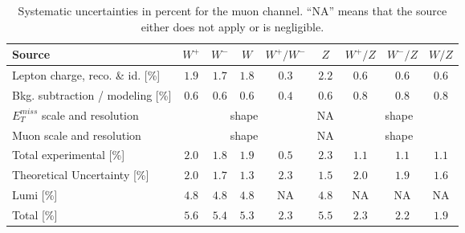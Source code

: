\begin{table}[htbp]
\centering
\small
\begin {tabular}  {lcccccccc}
Source & $W^+$ & $W^-$ & $W$ & $W^+/W^-$ & $Z$ & $W^+/Z$ & $W^-/Z$ & $W/Z$ \\
\hline
Lepton charge, reco. \& id. [\%] & $1.9$ & $1.7$ & $1.8$ & $0.3$ & $2.2$ & $0.6$ & $0.6$ & $0.6$ \\
Bkg. subtraction / modeling [\%] & $0.6$ & $0.6$ & $0.6$ & $0.4$ & $0.6$ & $0.8$ & $0.8$ & $0.8$ \\ 
$E_{T}^{miss}$ scale and resolution  & \multicolumn{4}{c}{shape}  & NA & \multicolumn{3}{c}{shape}  \\ 
Muon scale and resolution & \multicolumn{4}{c}{shape}  & NA & \multicolumn{3}{c}{shape}  \\ 
\hline
Total experimental [\%] & $2.0$ & $1.8$ & $1.9$ & $0.5$ & $2.3$ & $1.1$ & $1.1$ & $1.1$ \\
\hline 
Theoretical Uncertainty [\%] & $2.0$ & $1.7$ & $1.3$ & $2.3$ & $1.5$ & $2.0$ & $1.9$ & $1.6$ \\
\hline
Lumi [\%] & $4.8$ & $4.8$ & $4.8$ & NA & $4.8$ & NA & NA & NA \\
\hline
Total [\%] & $5.6$ & $5.4$ & $5.3$ & $2.3$ & $5.5$ & $2.3$ & $2.2$ & $1.9$ \\
\end {tabular}
\caption[.]{ \label{tab:syst_mu}
Systematic uncertainties in percent for the muon channel. ``NA'' means that the source either does not apply or is negligible.}
\end{table} 



